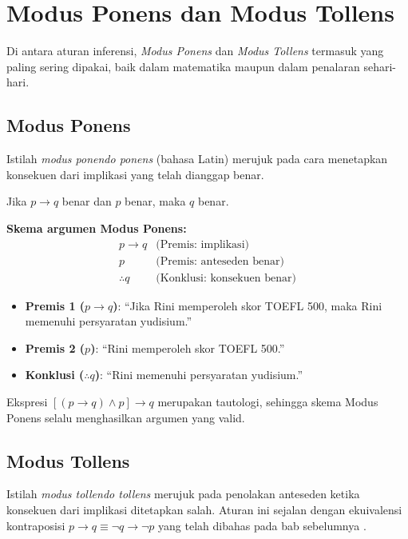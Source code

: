 \section{Modus Ponens dan Modus Tollens}

Di antara aturan inferensi, \textit{Modus Ponens} dan \textit{Modus Tollens} termasuk yang paling sering dipakai, baik dalam matematika maupun dalam penalaran sehari-hari.

\subsection{Modus Ponens}

Istilah \textit{modus ponendo ponens} (bahasa Latin) merujuk pada cara menetapkan konsekuen dari implikasi yang telah dianggap benar.

\begin{teorema}
Jika $p \rightarrow q$ benar dan $p$ benar, maka $q$ benar.
\end{teorema}

\textbf{Skema argumen Modus Ponens:}
\[
\begin{array}{cl}
p \rightarrow q & \text{(Premis: implikasi)} \\
p & \text{(Premis: anteseden benar)} \\
\hline
\therefore q & \text{(Konklusi: konsekuen benar)}
\end{array}
\]

\begin{contoh}
\begin{itemize}
    \item \textbf{Premis 1 ($p \rightarrow q$)}: ``Jika Rini memperoleh skor TOEFL 500, maka Rini memenuhi persyaratan yudisium.''
    \item \textbf{Premis 2 ($p$)}: ``Rini memperoleh skor TOEFL 500.''
    \item \textbf{Konklusi ($\therefore q$)}: ``Rini memenuhi persyaratan yudisium.''
\end{itemize}
\end{contoh}

Ekspresi $[(p \rightarrow q) \land p] \rightarrow q$ merupakan tautologi, sehingga skema Modus Ponens selalu menghasilkan argumen yang valid.

\subsection{Modus Tollens}

Istilah \textit{modus tollendo tollens} merujuk pada penolakan anteseden ketika konsekuen dari implikasi ditetapkan salah. Aturan ini sejalan dengan ekuivalensi kontraposisi $p \rightarrow q \equiv \neg q \rightarrow \neg p$ yang telah dibahas pada bab sebelumnya \cite{rosen2019}.

